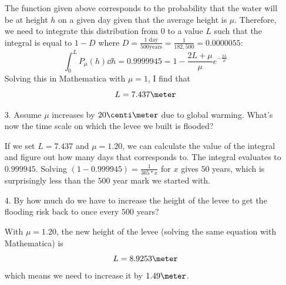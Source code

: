 \documentclass[a4paper,twoside]{article}
\begin{document}
\begin{itemize}
        \begin{problem}
            The function given above corresponds to the probability that the water will be at height $ h $ on a given day given that the average height is $ \mu $. Therefore, we need to integrate this distribution from $ 0 $ to a value $ L $ such that the integral is equal to $ 1 - D $ where $ D = \frac{1\text{ day}}{ 500\text{years}} = \frac{1}{182,500} = 0.0000055$:
            \begin{equation}
                \int_0^L P_{\mu}(h) \dd{h} = 0.9999945 = 1 - \frac{2L + \mu}{\mu} e^{- \frac{2L}{\mu}}
            \end{equation}
            Solving this in Mathematica with $ \mu = 1 $, I find that
            \begin{equation}
                L = 7.437\meter
            \end{equation}
        \end{problem}
    \item[3.] Assume $ \mu $ increases by $ 20\centi\meter $ due to global warming. What's now the time scale on which the levee we built is flooded?
        \begin{problem}
            If we set $ L = 7.437 $ and $ \mu = 1.20 $, we can calculate the value of the integral and figure out how many days that corresponds to. The integral evaluates to $ 0.999945 $. Solving $ (1-0.999945) = \frac{1}{365*x} $ for $ x $ gives $ 50 $ years, which is surprisingly less than the $ 500 $ year mark we started with.
        \end{problem}
    \item[4.] By how much do we have to increase the height of the levee to get the flooding risk back to once every $ 500 $ years?
        \begin{problem}
            With $ \mu = 1.20 $, the new height of the levee (solving the same equation with Mathematica) is
            \begin{equation}
                L = 8.9253\meter
            \end{equation}
            which means we need to increase it by $ 1.49\meter $.
        \end{problem}
\end{itemize}
\end{document}
